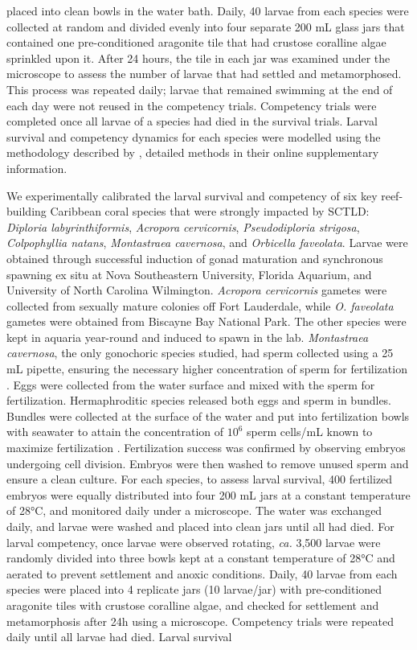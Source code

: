 \documentclass[preprint,12pt,authoryear]{elsarticle}
\begin{document}
placed into clean bowls in the water bath. Daily, 40 larvae from each species were collected at random and divided evenly into four separate 200 mL glass jars that contained one pre-conditioned aragonite tile that had crustose coralline algae sprinkled upon it. After 24 hours, the tile in each jar was examined under the microscope to assess the number of larvae that had settled and metamorphosed. This process was repeated daily; larvae that remained swimming at the end of each day were not reused in the competency trials. Competency trials were completed once all larvae of a species had died in the survival trials. Larval survival and competency dynamics for each species were modelled using the methodology described by \cite{figueiredo2022global}, detailed methods in their online supplementary information.
	
	We experimentally calibrated the larval survival and competency of six key reef-building Caribbean coral species that were strongly impacted by SCTLD: \textit{Diploria labyrinthiformis}, \textit{Acropora cervicornis}, \textit{Pseudodiploria strigosa}, \textit{Colpophyllia natans}, \textit{Montastraea cavernosa}, and \textit{Orbicella faveolata}. Larvae were obtained through successful induction of gonad maturation and synchronous spawning ex situ at Nova Southeastern University, Florida Aquarium, and University of North Carolina Wilmington. \textit{Acropora cervicornis} gametes were collected from sexually mature colonies off Fort Lauderdale, while \textit{O. faveolata} gametes were obtained from Biscayne Bay National Park. The other species were kept in aquaria year-round and induced to spawn in the lab. \textit{Montastraea cavernosa}, the only gonochoric species studied, had sperm collected using a 25 mL pipette, ensuring the necessary higher concentration of sperm for fertilization \citep{fogarty2012asymmetric, fogarty2012weak, dela2020optimising}. Eggs were collected from the water surface and mixed with the sperm for fertilization. Hermaphroditic species released both eggs and sperm in bundles. Bundles were collected at the surface of the water and put into fertilization bowls with seawater to attain the concentration of $10^6$ sperm cells/mL known to maximize fertilization \citep{fogarty2012asymmetric, fogarty2012weak, dela2020optimising}. Fertilization success was confirmed by observing embryos undergoing cell division. Embryos were then washed to remove unused sperm and ensure a clean culture. For each species, to assess larval survival, 400 fertilized embryos were equally distributed into four 200 mL jars at a constant temperature of 28°C, and monitored daily under a microscope. The water was exchanged daily, and larvae were washed and placed into clean jars until all had died. For larval competency, once larvae were observed rotating, \textit{ca.} 3,500 larvae were randomly divided into three bowls kept at a constant temperature of 28°C and aerated to prevent settlement and anoxic conditions. Daily, 40 larvae from each species were placed into  4 replicate jars (10 larvae/jar) with pre-conditioned aragonite tiles with crustose coralline algae, and checked for settlement and metamorphosis after 24h using a microscope. Competency trials were repeated daily until all larvae had died. Larval survival 
\end{document}

